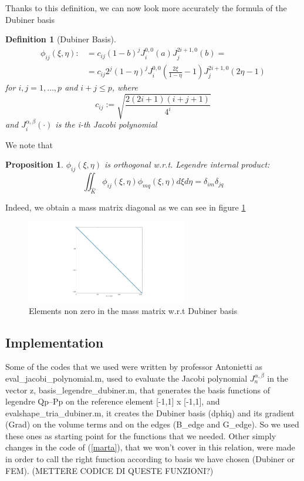\documentclass[a4paper,12pt]{article}
\newtheorem{definition}{Definition}
\newtheorem{prop}{Proposition}
\begin{document}
    Thanks to this definition, we can now look more accurately the formula of the Dubiner basis
    \begin{definition}[Dubiner Basis]
    \begin{equation}
    \begin{split}
    \phi_{ij}(\xi,\eta) :&= c_{ij}(1-b)^j J_i^{0,0}(a) J_j^{2i+1,0}(b)=
    \\&=c_{ij} 2^j (1-\eta)^j J_i^{0,0}(\frac{2\xi}{1-\eta}-1) J_j^{2i+1,0} (2\eta-1)
    \end{split}
    \end{equation}
    for $i,j=1,\dots,p$ and $i+j \le p$, where
    \begin{equation}
    c_{ij} := \sqrt{\frac{2(2i+1)(i+j+1)}{4^i}}
    \end{equation}
    and $J_i^{\alpha,\beta}(\cdot)$ is the i-th Jacobi polynomial
    \end{definition}
    
    We note that
    \begin{prop}
    $\phi_{ij}(\xi,\eta)$ is orthogonal w.r.t. Legendre internal product:
    \begin{equation}
    \iint_{\hat{K}}{\phi_{ij}(\xi,\eta)\phi_{mq}(\xi,\eta) d\xi d\eta}=\delta_{im}\delta_{jq}
    \end{equation}
    \end{prop}
    
    Indeed, we obtain a mass matrix diagonal as we can see in figure \ref{mass}
    
    \begin{figure}[ht]
    \begin{center}
    \includegraphics[width = 7cm]{./mass_dubiner.jpg}
    	\caption{Elements non zero in the mass matrix w.r.t Dubiner basis}
    	\label{mass}
    \end{center}
    \end{figure}
    
    \subsection{Implementation}
    Some of the codes that we used were written by professor Antonietti as eval\_jacobi\_polynomial.m, used to evaluate the Jacobi polynomial $J_n^{\alpha,\beta}$ in the vector z, basis\_legendre\_dubiner.m, that generates the basis functions of legendre Qp--Pp on the reference element [-1,1] x [-1,1], and evalshape\_tria\_dubiner.m, it creates the Dubiner basis (dphiq) and its gradient (Grad) on the volume terms and on the edges (B\_edge and G\_edge). So we used these ones as starting point for the functions that we needed.\newline
    Other simply changes in the code of (\ref{marta}), that we won't cover in this relation, were made in order to call the right function according to basis we have chosen (Dubiner or FEM).
    (METTERE CODICE DI QUESTE FUNZIONI?)
\end{document}
